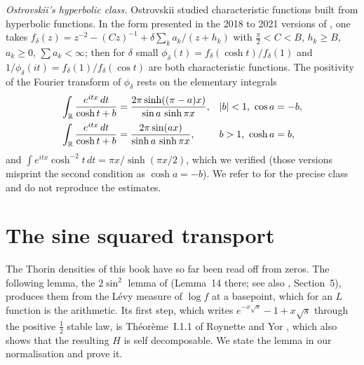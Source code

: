 \emph{Ostrovskii's hyperbolic class.} Ostrovskii \cite{ostrovskii1970} studied characteristic functions built from hyperbolic functions. In the form presented in the 2018 to 2021 versions of \cite{polson2018vdp}, one takes $f_\delta(z) = z^{-2}-(Cz)^{-1}+\delta\sum_ka_k/(z+h_k)$ with $\frac\pi2<C<B$, $h_k\ge B$, $a_k\ge0$, $\sum a_k<\infty$; then for $\delta$ small $\phi_\delta(t) = f_\delta(\cosh t)/f_\delta(1)$ and $1/\phi_\delta(it) = f_\delta(1)/f_\delta(\cos t)$ are both characteristic functions. The positivity of the Fourier transform of $\phi_\delta$ rests on the elementary integrals
\begin{align*}
\int_{\mathbb{R}}\frac{e^{itx}\,dt}{\cosh t+b} &= \frac{2\pi\sinh((\pi-a)x)}{\sin a\,\sinh\pi x}, & |b|<1,\ \cos a &= -b,\\
\int_{\mathbb{R}}\frac{e^{itx}\,dt}{\cosh t+b} &= \frac{2\pi\sin(ax)}{\sinh a\,\sinh\pi x}, & b>1,\ \cosh a &= b,
\end{align*}
and $\int e^{itx}\cosh^{-2}t\,dt = \pi x/\sinh(\pi x/2)$, which we verified (those versions misprint the second condition as $\cosh a = -b$). We refer to \cite{ostrovskii1970} for the precise class and do not reproduce the estimates.

\section{The sine squared transport}

The Thorin densities of this book have so far been read off from zeros. The following lemma, the $2\sin^2$ lemma of \cite{polson2018vdp} (Lemma~14 there; see also \cite{polson2017}, Section~5), produces them from the L\'evy measure of $\log f$ at a basepoint, which for an $L$ function is the arithmetic. Its first step, which writes $e^{-x\sqrt s}-1+x\sqrt s$ through the positive $\frac12$ stable law, is Th\'eor\`eme~I.1.1 of Roynette and Yor \cite{roynetteyor2005}, which also shows that the resulting $H$ is self decomposable. We state the lemma in our normalisation and prove it.


